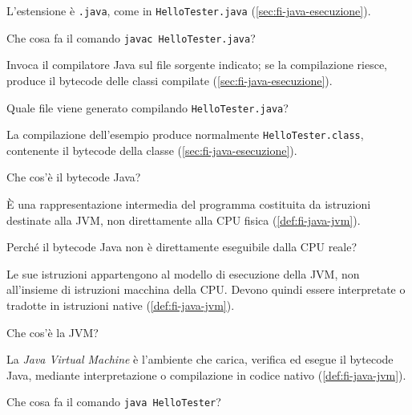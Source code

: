 L'estensione è \texttt{.java}, come in \texttt{HelloTester.java}
(\cref{sec:fi-java-esecuzione}).

\begin{exercise}
\label{ex:fi-esercizi-introduzione-java-javac}
Che cosa fa il comando \texttt{javac HelloTester.java}?
\end{exercise}

Invoca il compilatore Java sul file sorgente indicato; se la compilazione riesce,
produce il bytecode delle classi compilate (\cref{sec:fi-java-esecuzione}).

\begin{exercise}
\label{ex:fi-esercizi-introduzione-java-file-class}
Quale file viene generato compilando \texttt{HelloTester.java}?
\end{exercise}

La compilazione dell'esempio produce normalmente
\texttt{HelloTester.class}, contenente il bytecode della classe
(\cref{sec:fi-java-esecuzione}).

\begin{exercise}
\label{ex:fi-esercizi-introduzione-java-bytecode}
Che cos'è il bytecode Java?
\end{exercise}

È una rappresentazione intermedia del programma costituita da istruzioni
destinate alla JVM, non direttamente alla CPU fisica (\cref{def:fi-java-jvm}).

\begin{exercise}
\label{ex:fi-esercizi-introduzione-java-bytecode-cpu}
Perché il bytecode Java non è direttamente eseguibile dalla CPU reale?
\end{exercise}

Le sue istruzioni appartengono al modello di esecuzione della JVM, non
all'insieme di istruzioni macchina della CPU. Devono quindi essere interpretate o
tradotte in istruzioni native (\cref{def:fi-java-jvm}).

\begin{exercise}
\label{ex:fi-esercizi-introduzione-java-jvm}
Che cos'è la JVM?
\end{exercise}

La \emph{Java Virtual Machine} è l'ambiente che carica, verifica ed esegue il
bytecode Java, mediante interpretazione o compilazione in codice nativo
(\cref{def:fi-java-jvm}).

\begin{exercise}
\label{ex:fi-esercizi-introduzione-java-java-hello}
Che cosa fa il comando \texttt{java HelloTester}?
\end{exercise}

